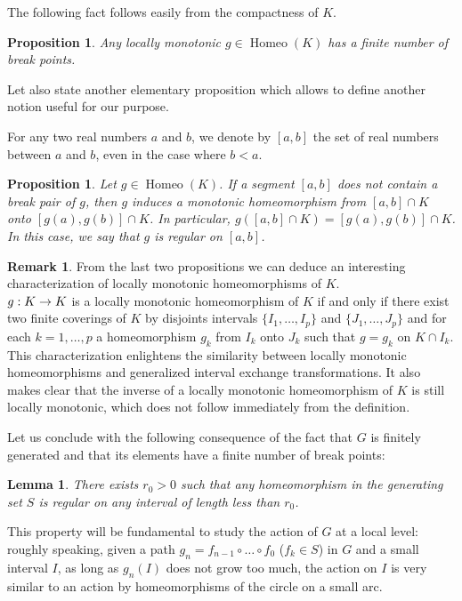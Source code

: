\documentclass[10pt]{amsart}
\newtheorem{lemm}[theo]{Lemma}\newtheorem{prop}[theo]{Proposition}\newtheorem{coro}[theo]{Corollary}\newtheorem{conj}[theo]{Conjecture}
\theoremstyle{definition}\newtheorem{defi}[theo]{Definition}\newtheorem{rema}[theo]{Remark}\newtheorem{exam}[theo]{Example}\newtheorem{exem}[theo]{Example}\newtheorem{nota}[theo]{Notation}
\DeclareMathOperator{\Homeo}{Homeo}
\newcounter{setofcase}
\newcounter{case}[setofcase]
\renewcommand*{\to}{\mathchoice{\longrightarrow}{\rightarrow}{\rightarrow}{\rightarrow}}
\begin{document}
The following fact follows easily from the compactness of $K$.

\begin{prop}\label{finite}
Any locally monotonic $g\in \Homeo(K)$ has a finite number of break points.
\end{prop}

Let also state another elementary proposition which allows to define another notion useful for our purpose.

For any two real numbers $a$ and $b$, we denote by $[a,b]$ the set of real numbers between $a$ and $b$, even in the case where $b<a$.

\begin{prop}\label{regularsegment}
Let $g\in \Homeo(K)$. If a segment $[a,b]$ does not contain a break pair of $g$, then $g$ induces a monotonic homeomorphism from $[a,b]\cap K$ onto $[g(a),g(b)]\cap K$. In particular, $g([a,b]\cap K)=[g(a),g(b)]\cap K$. In this case, we say that $g$ is \emph{regular} on $[a,b]$.
\end{prop}

\begin{rema}
From the last two propositions we can deduce an interesting characterization of locally monotonic homeomorphisms of $K$.\\
$g:K\to K$ is a locally monotonic homeomorphism of $K$ if and only if there exist two finite coverings of $K$ by disjoints intervals $\{I_1,\dots,I_p\}$ and $\{J_1,\dots, J_p\}$ and for each $k=1,\dots,p$ a homeomorphism $g_k$ from $I_k$ onto $J_k$ such that $g=g_k$ on $K\cap I_k$.\\
This characterization enlightens the similarity between locally monotonic homeomorphisms and generalized interval exchange transformations. It also makes clear that the inverse of a locally monotonic homeomorphism of $K$ is still locally monotonic, which does not follow immediately from the definition.
\end{rema}

Let us conclude with the following consequence of the fact that $G$ is finitely generated and that its elements have a finite number of break points:

\begin{lemm}\label{monotonic}
There exists $r_0>0$ such that any homeomorphism in the generating set $S$ is regular on any interval of length less than $r_0$.
\end{lemm}

This property will be fundamental to study the action of $G$ at a local level: roughly speaking, given a path $g_n=f_{n-1}\circ\dots \circ f_0$ ($f_k\in S$) in $G$ and a small interval $I$, as long as $g_n(I)$ does not grow too much, the action on $I$ is very similar to an action by homeomorphisms of the circle on a small arc.
\end{document}
